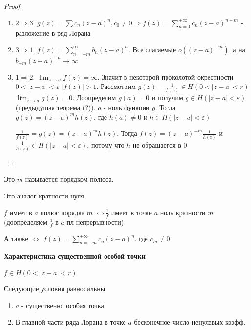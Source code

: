\begin{proof}
    \begin{enumerate}
        \item $2 \Rightarrow 3$. $g(z) = \sum c_n (z - a)^n, c_0 \neq 0 \Rightarrow f(z) = \sum_{n = 0}^{+\infty} c_n(z - a)^{n - m}$ - разложение в ряд Лорана
        \item $3 \Rightarrow 1$. $f(z) = \sum_{n = -m}^{\infty} b_n(z - a)^n$. Все слагаемые $o((z - a)^{-m})$, а на $b_{-m}(z - a)^{-n} \rightarrow \infty$
        \item $1 \Rightarrow 2$. $\lim_{z \to a} f(z) = \infty$. Значит в некоторой проколотой окрестности $0 <|z - a| < \varepsilon$
        $|f(z)| > 1$. Рассмотрим $g(z) = \frac{1}{f(z)} \in H(0 < |z - a| < r)$
        $\lim_{z \to a} g(z) = 0$. Доопределим $g(a) = 0$ и получим $g \in H(|z - a| < \varepsilon)$
        (предыдущая теорема (?)). $a$ - ноль функции $g$. Тогда $g(z) = (z - a)^m h(z)$,
        где $h(a) \neq 0$ и $h \in H(|z - a| < \varepsilon)$

        $\frac{1}{f(z)} = g(z) = (z - a)^m h(z)$. Тогда $f(z) = (z - a)^{-m} \frac{1}{h(z)}$ и 
        $\frac{1}{h(z)} \in H(|z - a| < \varepsilon)$, потому что $h$ не обращается в 0 
    \end{enumerate}
\end{proof}

\begin{definition}
    Это $m$ называется порядком полюса.
    \begin{remark}
        Это аналог кратности нуля
    \end{remark}
\end{definition}

\begin{remark}
    $f$ имеет в $a$ полюс порядка $m$ $\Longleftrightarrow \frac{1}{f}$ имеет в 
    точке $a$ ноль кратности $m$ (доопределяем $\frac{1}{f}$ в $a$ пл непрерывности)

    А также $\Longleftrightarrow$ $f(z) = \sum_{n = -m}^{+\infty} c_n (z - a)^n$, где $c_m \neq 0$
\end{remark}

\begin{theorem}
    \textbf{Характеристика существенной особой точки}

    $f \in H(0 < |z - a| < r)$

    Следующие условия равносильны

    \begin{enumerate}
        \item $a$ - существенно особая точка
        \item В главной части ряда Лорана в точке $a$ бесконечное число ненулевых коэфф.
    \end{enumerate}
\end{theorem}

